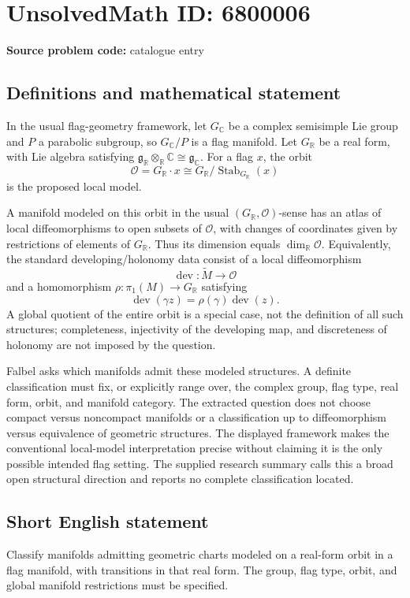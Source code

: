 \documentclass[11pt]{article}
\newcommand{\R}{\mathbb{R}}
\newcommand{\C}{\mathbb{C}}
\begin{document}
\section*{UnsolvedMath ID: 6800006}
\textbf{Source problem code:} catalogue entry
\subsection{Definitions and mathematical statement}
In the usual flag-geometry framework, let \(G_{\C}\) be a complex semisimple Lie group and \(P\) a parabolic subgroup, so \(G_{\C}/P\) is a flag manifold. Let \(G_{\R}\) be a real form, with Lie algebra satisfying \(\mathfrak g_{\R}\otimes_{\R}\C\cong\mathfrak g_{\C}\). For a flag \(x\), the orbit
\[
\mathcal O=G_{\R}\cdot x\cong G_{\R}/\operatorname{Stab}_{G_{\R}}(x)
\]
is the proposed local model.

A manifold modeled on this orbit in the usual \((G_{\R},\mathcal O)\)-sense has an atlas of local diffeomorphisms to open subsets of \(\mathcal O\), with changes of coordinates given by restrictions of elements of \(G_{\R}\). Thus its dimension equals \(\dim_{\R}\mathcal O\). Equivalently, the standard developing/holonomy data consist of a local diffeomorphism
\[
\operatorname{dev}:\widetilde M\to\mathcal O
\]
and a homomorphism \(\rho:\pi_1(M)\to G_{\R}\) satisfying
\[
\operatorname{dev}(\gamma z)=\rho(\gamma)\operatorname{dev}(z).
\]
A global quotient of the entire orbit is a special case, not the definition of all such structures; completeness, injectivity of the developing map, and discreteness of holonomy are not imposed by the question.

Falbel asks which manifolds admit these modeled structures. A definite classification must fix, or explicitly range over, the complex group, flag type, real form, orbit, and manifold category. The extracted question does not choose compact versus noncompact manifolds or a classification up to diffeomorphism versus equivalence of geometric structures. The displayed framework makes the conventional local-model interpretation precise without claiming it is the only possible intended flag setting. The supplied research summary calls this a broad open structural direction and reports no complete classification located.
\subsection{Short English statement}
Classify manifolds admitting geometric charts modeled on a real-form orbit in a flag manifold, with transitions in that real form. The group, flag type, orbit, and global manifold restrictions must be specified.
\end{document}
